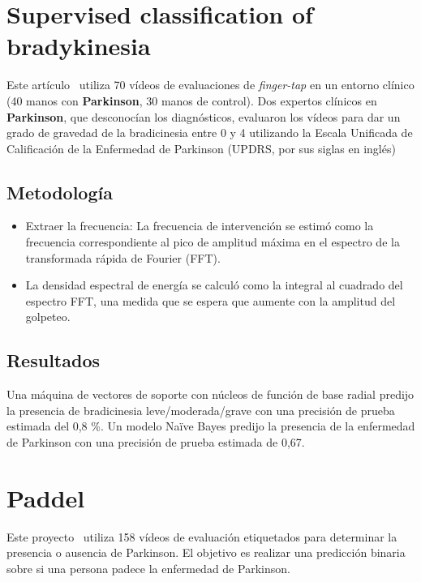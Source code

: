 \section{Supervised classification of bradykinesia}
Este artículo~\cite{williams2020supervised} utiliza 70 vídeos de evaluaciones de \textit{finger-tap} en un entorno clínico (40 manos con \textbf{Parkinson}, 30 manos de control).
Dos expertos clínicos en \textbf{Parkinson}, que desconocían los diagnósticos, evaluaron los vídeos para dar un grado de gravedad de la bradicinesia entre 0 y 4 utilizando la Escala Unificada de Calificación de la Enfermedad de Parkinson (UPDRS, por sus siglas en inglés)


\subsection{Metodología}
\begin{itemize}
	\item Extraer la frecuencia: La frecuencia de intervención se estimó como la frecuencia correspondiente al pico de amplitud máxima en el espectro de la transformada rápida de Fourier (FFT). 
	\item La densidad espectral de energía se calculó como la integral al cuadrado del espectro FFT, una medida que se espera que aumente con la amplitud del golpeteo.
\end{itemize}
\subsection{Resultados}
Una máquina de vectores de soporte con núcleos de función de base radial predijo la presencia de bradicinesia leve/moderada/grave con una precisión de prueba estimada del 0,8 \%.
Un modelo Naïve Bayes predijo la presencia de la enfermedad de Parkinson con una precisión de prueba estimada de 0,67. 

\section{Paddel}

Este proyecto~\cite{paddelRepo} utiliza 158 vídeos de evaluación etiquetados para determinar la presencia o ausencia de Parkinson. El objetivo es realizar una predicción binaria sobre si una persona padece la enfermedad de Parkinson.

